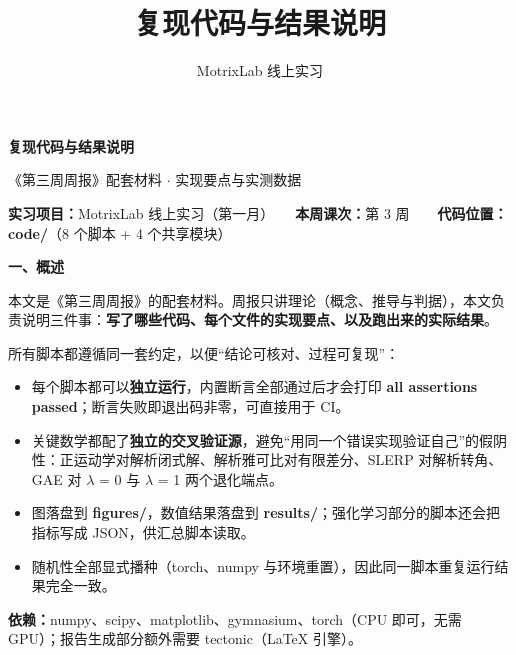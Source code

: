 \documentclass[11pt,a4paper]{ctexart}
\title{复现代码与结果说明}
\author{MotrixLab 线上实习}
\newcommand{\hOne}[1]{\par\vspace{0.5em}%
  {\color{hdark}\Large\bfseries #1}\par\vspace{0.1em}%
  \noindent{\color{hdark}\rule{\linewidth}{0.9pt}}\par\vspace{0.35em}}
\begin{document}
\begin{center}{\color{hdark}\Huge\bfseries 复现代码与结果说明}\end{center}

\begin{center}{\color{hmid}\large 《第三周周报》配套材料 $\cdot$ 实现要点与实测数据}\end{center}

\vspace{0.35cm}

\noindent \textbf{实习项目：}MotrixLab 线上实习（第一月）　　\textbf{本周课次：}第 3 周　　\textbf{代码位置：}\textbf{code/}（8 个脚本 + 4 个共享模块）\par

\vspace{0.30cm}

\hOne{一、概述}

本文是《第三周周报》的配套材料。周报只讲理论（概念、推导与判据），本文负责说明三件事：\textbf{写了哪些代码、每个文件的实现要点、以及跑出来的实际结果}。\par

所有脚本都遵循同一套约定，以便“结论可核对、过程可复现”：\par

\begin{itemize}[leftmargin=1.6em,itemsep=0.15em,topsep=0.25em]

\item 每个脚本都可以\textbf{独立运行}，内置断言全部通过后才会打印 \textbf{all assertions passed}；断言失败即退出码非零，可直接用于 CI。

\item 关键数学都配了\textbf{独立的交叉验证源}，避免“用同一个错误实现验证自己”的假阴性：正运动学对解析闭式解、解析雅可比对有限差分、SLERP 对解析转角、GAE 对 $\lambda$ = 0 与 $\lambda$ = 1 两个退化端点。

\item 图落盘到 \textbf{figures/}，数值结果落盘到 \textbf{results/}；强化学习部分的脚本还会把指标写成 JSON，供汇总脚本读取。

\item 随机性全部显式播种（torch、numpy 与环境重置），因此同一脚本重复运行结果完全一致。

\end{itemize}

\textbf{依赖：}numpy、scipy、matplotlib、gymnasium、torch（CPU 即可，无需 GPU）；报告生成部分额外需要 tectonic（LaTeX 引擎）。\par
\end{document}
